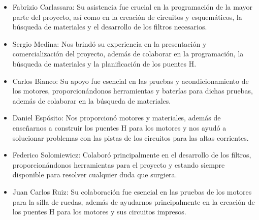\documentclass{article}
\begin{document}
\begin{itemize}

    \item Fabrizio Carlassara: Su asistencia fue crucial en la programación de la mayor parte del proyecto, así como en la creación de circuitos y esquemáticos, la búsqueda de materiales y el desarrollo de los filtros necesarios.


    \item Sergio Medina: Nos brindó su experiencia en la presentación y comercialización del proyecto, además de colaborar en la programación, la búsqueda de materiales y la planificación de los puentes H.


    \item Carlos Bianco: Su apoyo fue esencial en las pruebas y acondicionamiento de los motores, proporcionándonos herramientas y baterías para dichas pruebas, además de colaborar en la búsqueda de materiales.


    \item Daniel Espósito: Nos proporcionó motores y materiales, además de enseñarnos a construir los puentes H para los motores y nos ayudó a solucionar problemas con las pistas de los circuitos para las altas corrientes.

    \item Federico Solomiewicz: Colaboró principalmente en el desarrollo de los filtros, proporcionándonos herramientas para el proyecto y estando siempre disponible para resolver cualquier duda que surgiera.


    \item Juan Carlos Ruiz: Su colaboración fue esencial en las pruebas de los motores para la silla de ruedas, además de ayudarnos principalmente en la creación de los puentes H para los motores y sus circuitos impresos.

\end{itemize}
\end{document}
